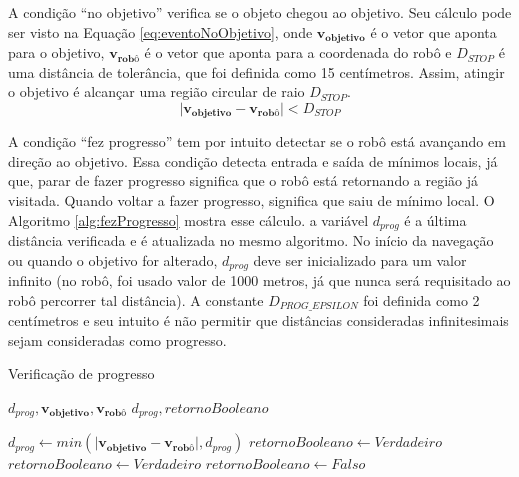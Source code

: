 		A condição ``no objetivo'' verifica se o objeto chegou ao objetivo. Seu cálculo pode
		ser visto na Equação \ref{eq:eventoNoObjetivo}, onde $\mathbf{v_{objetivo}}$ é o vetor 
		que aponta para o objetivo, $\mathbf{v_{\text{robô}}}$ é o vetor que aponta para a coordenada 
		do robô e $D_{STOP}$ é uma distância de tolerância, que foi definida como 15 centímetros. 
		Assim, atingir o objetivo é alcançar uma região circular de raio $D_{STOP}$.
		\begin{equation}
			\label{eq:eventoNoObjetivo}
			\mid \mathbf{v_{\text{objetivo}}} - \mathbf{v_{\text{robô}}} \mid < D_{STOP}
		\end{equation}
		
		A condição ``fez progresso'' tem por intuito detectar se o robô está avançando em 
		direção ao objetivo. Essa condição detecta entrada e saída de mínimos locais, já que, 
		parar de fazer progresso significa que o robô está retornando a região já visitada. Quando
		voltar a fazer progresso, significa que saiu de mínimo local. O Algoritmo 
		\ref{alg:fezProgresso} mostra esse cálculo. a variável $d_{prog}$ é a última distância 
		verificada e é atualizada no mesmo algoritmo. No início da navegação ou quando o objetivo
		for alterado, $d_{prog}$ deve ser inicializado para um valor infinito (no robô, foi usado 
		valor de 1000 metros, já que nunca será requisitado ao robô percorrer tal distância). A 
		constante $D_{PROG\_EPSILON}$ foi definida como 2 centímetros e seu intuito é não permitir
		que distâncias consideradas infinitesimais sejam consideradas como progresso.
		\begin{algorithm}
		\caption{Verificação de progresso}
		\label{alg:fezProgresso}%
		\begin{algorithmic}[1]
	
		\REQUIRE $d_{prog}, \mathbf{v_{\text{objetivo}}}, \mathbf{v_{\text{robô}}}$
		\ENSURE $d_{prog}, retornoBooleano$
	
			\STATE $d_{prog} \leftarrow min(\mid \mathbf{v_{\text{objetivo}}} - \mathbf{v_{\text{robô}}} \mid, d_{prog})$
			\STATE $retornoBooleano \leftarrow Verdadeiro$
			\STATE $retornoBooleano \leftarrow Verdadeiro$
		\ELSE
			\STATE $retornoBooleano \leftarrow Falso$ 
		\ENDIF
	
		\end{algorithmic}
		\end{algorithm}
	
